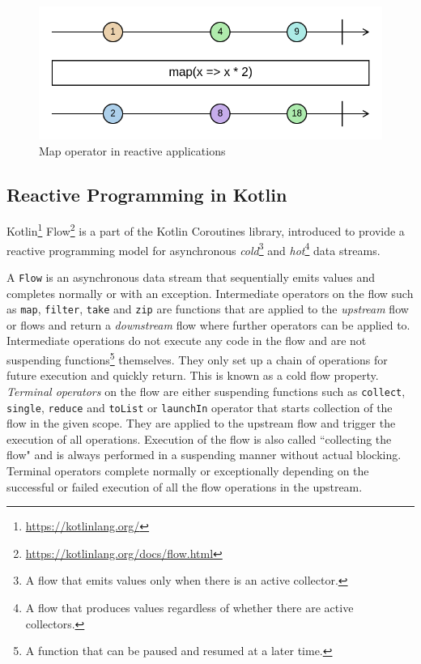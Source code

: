 \begin{figure}
    \centering
    \includegraphics[width=\linewidth]{figures/map-marble.png}
    \caption{Map operator in reactive applications}
    \label{fig:reactive-map}
\end{figure}

\subsection{Reactive Programming in Kotlin}

Kotlin\footnote{\url{https://kotlinlang.org/}} Flow\footnote{\url{https://kotlinlang.org/docs/flow.html}} is a part of the Kotlin Coroutines library, introduced to provide a reactive programming model for asynchronous \textit{cold}\footnote{A flow that emits values only when there is an active collector.} and \textit{hot}\footnote{A flow that produces values regardless of whether there are active collectors.} data streams.

A \texttt{Flow} is an asynchronous data stream that sequentially emits values and completes normally or with an exception. Intermediate operators on the flow such as \texttt{map}, \texttt{filter}, \texttt{take} and \texttt{zip} are functions that are applied to the \textit{upstream} flow or flows and return a \textit{downstream} flow where further operators can be applied to. Intermediate operations do not execute any code in the flow and are not suspending functions\footnote{A function that can be paused and resumed at a later time.} themselves. They only set up a chain of operations for future execution and quickly return. This is known as a cold flow property. \textit{Terminal operators} on the flow are either suspending functions such as \texttt{collect}, \texttt{single}, \texttt{reduce} and \texttt{toList} or \texttt{launchIn} operator that starts collection of the flow in the given scope. They are applied to the upstream flow and trigger the execution of all operations. Execution of the flow is also called ``collecting the flow" and is always performed in a suspending manner without actual blocking. Terminal operators complete normally or exceptionally depending on the successful or failed execution of all the flow operations in the upstream.

